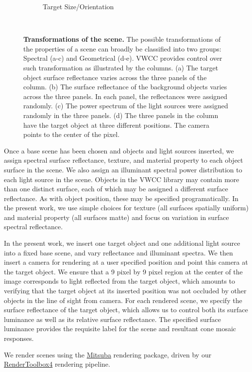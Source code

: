 \documentclass{jov}
\begin{document}
\begin{figure}
\begin{subfigure}[b]{0.18 \textwidth}
        \caption{Target Size/Orientation}
        \label{fig:targetSizeOrientation}
    \end{subfigure}
    ~
    \caption{{\bf Transformations of the scene.} The possible transformations of the properties of a scene can broadly be classified into two groups: Spectral (a-c) and Geometrical (d-e). VWCC provides control over such transformation as illustrated by the columns. (a) The target object surface reflectance varies across the three panels of the column. (b) The surface reflectance of the background objects varies across the three panels. In each panel, the reflectances were assigned randomly. (c) The power spectrum of the light sources were assigned randomly in the three panels. (d) The three panels in the column have the target object at three different positions. The camera points to the center of the pixel. }\label{fig:VWCCTransformations}
\end{figure}

Once a base scene has been chosen and objects and light sources inserted, we assign spectral surface reflectance, texture, and material property to each object surface in the scene. We also assign an illuminant spectral power distribution to each light source in the scene. Objects in the VWCC library may contain more than one distinct surface, each of which may be assigned a different surface reflectance. As with object position, these may be specified programatically. In the present work, we use simple choices for texture (all surfaces spatially uniform) and material property (all surfaces matte) and focus on variation in surface spectral reflectance. 

In the present work, we insert one target object and one additional light source into a fixed base scene, and vary reflectance and illuminant spectra. We then insert a camera for rendering at a user specified position and point this camera at the target object. We ensure that a 9 pixel by 9 pixel region at the center of the image corresponds to light reflected from the target object, which amounts to verifying that the target object at its inserted position was not occluded by other objects in the line of sight from camera. For each rendered scene, we specify the surface reflectance of the target object, which allows us to control both its surface luminance as well as its relative surface reflectance. The specified surface luminance provides the requisite label for the scene and resultant cone mosaic responses.

We render scenes using the \href{https://www.mitsuba-renderer.org}{Mitsuba} \cite{jakob2015mitsuba} rendering package, driven by our \href{http://rendertoolbox.org}{RenderToolbox4} \cite{heasly2014rendertoolbox3} rendering pipeline.
\end{document}
